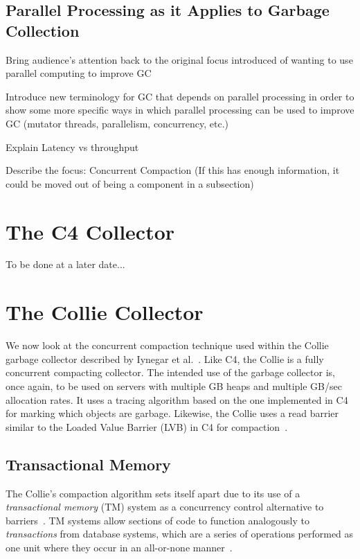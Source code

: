 \documentclass{sig-alternate}
\begin{document}
\subsection{Parallel Processing as it Applies to Garbage Collection}
\label{sec:parallelProcessingGarbageCollection}

Bring audience's attention back to the original focus introduced 
of wanting to use parallel computing to improve GC

Introduce new terminology for GC that depends on parallel processing 
in order to show some more specific ways in which parallel processing 
can be used to improve GC (mutator threads, parallelism, concurrency, etc.)

Explain Latency vs throughput

Describe the focus: Concurrent Compaction (If this has enough information, 
it could be moved out of being a component in a subsection)


\section{The C4 Collector}
\label{sec:c4}

To be done at a later date...


\section{The Collie Collector}
\label{sec:collie}

We now look at the concurrent compaction technique used within the 
Collie garbage collector described by Iynegar et al.~\cite{Iyengar:Collie}. 
Like C4, the Collie is a fully concurrent compacting collector.
The intended use of the garbage collector is, once again, to
be used on servers with multiple GB heaps and multiple GB/sec allocation rates. 
It uses a tracing algorithm based on the one implemented in C4 for 
marking which objects are garbage. Likewise, the Collie uses a read
barrier similar to the Loaded Value Barrier (LVB) in C4 for 
compaction~\cite{Tene:C4}.


\subsection{Transactional Memory}
\label{sec:collieTM}
The Collie's compaction algorithm sets itself apart due to its use 
of a \emph{transactional memory} (TM) system as a concurrency control 
alternative to barriers~\cite{Iyengar:Collie}. TM systems allow
sections of code to function 
analogously to \emph{transactions} from database systems, 
which are a series of operations performed as one unit where 
they occur in an all-or-none manner~\cite{wiki:atomicity}.
\end{document}
